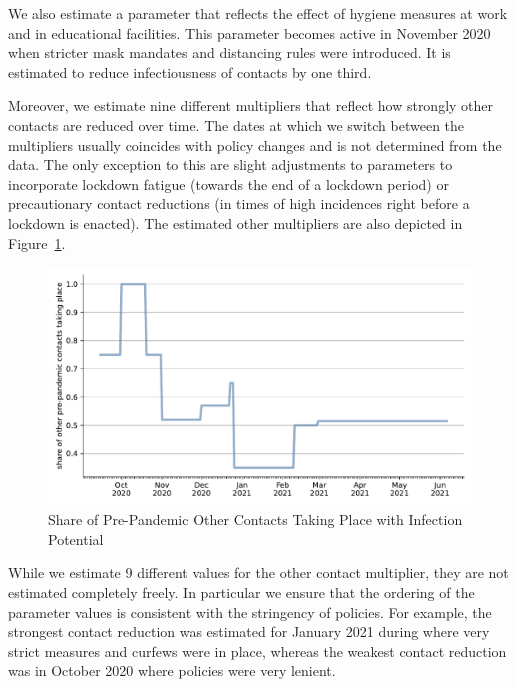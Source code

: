 We also estimate a parameter that reflects the effect of hygiene measures
at work and in educational facilities. This parameter becomes active in November 2020
when stricter mask mandates and distancing rules were introduced. It is estimated to
reduce infectiousness of contacts by one third.

Moreover, we estimate nine different multipliers that reflect how strongly other
contacts are reduced over time. The dates at which we switch between the multipliers
usually coincides with policy changes and is not determined from the data. The only
exception to this are slight adjustments to parameters to incorporate lockdown fatigue
(towards the end of a lockdown period) or precautionary contact reductions (in times
of high incidences right before a lockdown is enacted). The estimated other multipliers
are also depicted in Figure~\ref{fig:other_multiplier}.

\begin{figure}
    \centering
    \includegraphics[width=\textwidth]{figures/results/figures/data/other_multiplier}
    \caption{Share of Pre-Pandemic Other Contacts Taking Place with Infection Potential}
    \label{fig:other_multiplier}
\end{figure}

While we estimate 9 different values for the other contact multiplier, they are not
estimated completely freely. In particular we ensure that the ordering of the parameter
values is consistent with the stringency of policies. For example, the strongest
contact reduction was estimated for January 2021 during where very strict measures
and curfews were in place, whereas the weakest contact reduction was in October 2020
where policies were very lenient.

